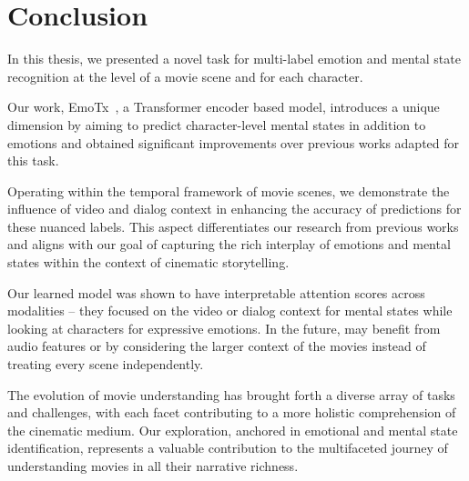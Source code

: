 \chapter{Conclusion}
\label{ch:conclusion}
In this thesis, we presented a novel task for multi-label emotion and mental state recognition at the level of a movie scene and for each character.

Our work, EmoTx~\cite{dhruv2023emotx}, a Transformer encoder based model, introduces a unique dimension by aiming to predict character-level mental states in addition to emotions and obtained significant improvements over previous works adapted for this task. 

Operating within the temporal framework of movie scenes, we demonstrate the influence of video and dialog context in enhancing the accuracy of predictions for these nuanced labels. This aspect differentiates our research from previous works and aligns with our goal of capturing the rich interplay of emotions and mental states within the context of cinematic storytelling.

Our learned model was shown to have interpretable attention scores across modalities -- they focused on the video or dialog context for mental states while looking at characters for expressive emotions.
In the future, \modelname{} may benefit from audio features or by considering the larger context of the movies instead of treating every scene independently.

The evolution of movie understanding has brought forth a diverse array of tasks and challenges, with each facet contributing to a more holistic comprehension of the cinematic medium. Our exploration, anchored in emotional and mental state identification, represents a valuable contribution to the multifaceted journey of understanding movies in all their narrative richness.
